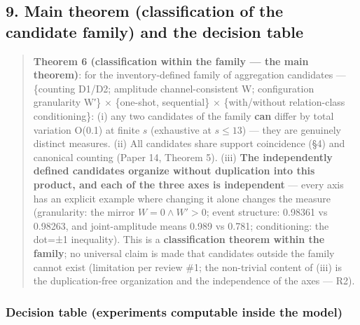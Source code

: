 \documentclass[
]{article}
\begin{document}
\subsection{9. Main theorem (classification of the candidate family) and
the decision
table}\label{main-theorem-classification-of-the-candidate-family-and-the-decision-table}

\begin{quote}
\textbf{Theorem 6 (classification within the family --- the main
theorem)}: for the inventory-defined family of aggregation candidates
--- \{counting D1/D2; amplitude channel-consistent W; configuration
granularity W′\} × \{one-shot, sequential\} × \{with/without
relation-class conditioning\}: (i) any two candidates of the family
\textbf{can} differ by total variation O(0.1) at finite \(s\)
(exhaustive at \(s\le13\)) --- they are genuinely distinct measures.
(ii) All candidates share support coincidence (§4) and canonical
counting (Paper 14, Theorem 5). (iii) \textbf{The independently defined
candidates organize without duplication into this product, and each of
the three axes is independent} --- every axis has an explicit example
where changing it alone changes the measure (granularity: the mirror
\(W=0\wedge W'>0\); event structure: 0.98361 vs 0.98263, and
joint-amplitude means 0.989 vs 0.781; conditioning: the dot=±1
inequality). This is a \textbf{classification theorem within the
family}; no universal claim is made that candidates outside the family
cannot exist (limitation per review \#1; the non-trivial content of
(iii) is the duplication-free organization and the independence of the
axes --- R2).
\end{quote}

\subsubsection{Decision table (experiments computable inside the
model)}\label{decision-table-experiments-computable-inside-the-model}
\end{document}
